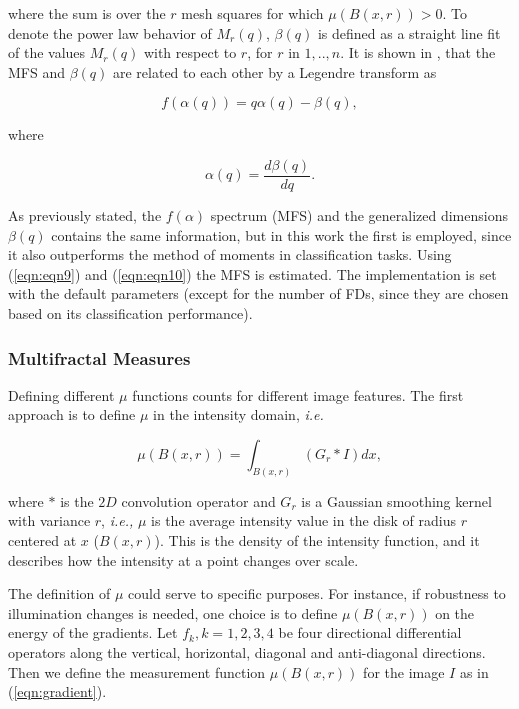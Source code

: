 \documentclass[a4paper,10pt]{article}
\begin{document}
where the sum is over the $r$ mesh squares for which $\mu(B(x,r)) > 0$. To denote the power law behavior of $M_{r}(q)$, $\beta(q)$ is defined as a straight line fit of the values $M_{r}(q)$ with respect to $r$, for $r$ in $1,..,n$. It is shown in \cite{Falconer97}, that the MFS and $\beta(q)$ are related to each other by a Legendre transform as

\begin{equation}
f(\alpha(q)) = q \alpha(q) - \beta(q),
\label{eqn:eqn9}
\end{equation}

where

\begin{equation}
\alpha(q) = \frac{d\beta(q)}{dq}.
\label{eqn:eqn10}
\end{equation}

As previously stated, the $f(\alpha)$ spectrum (MFS) and the generalized dimensions $\beta(q)$ contains the same information, but in this work the first is employed, since it also outperforms the method of moments in classification tasks. Using (\ref{eqn:eqn9}) and (\ref{eqn:eqn10}) the MFS is estimated. The implementation is set with the default parameters (except for the number of FDs, since they are chosen based on its classification performance).


\subsubsection{Multifractal Measures}
Defining different $\mu$ functions counts for different image features. The first approach is to define $\mu$ in the intensity domain, {\em i.e.}

\begin{equation}
\mu(B(x,r)) = \int_{B(x,r)}{(G_{r} \ast I)} dx,
\label{eqn:eqn11}
\end{equation}

where $\ast$ is the $2D$ convolution operator and $G_{r}$ is a Gaussian smoothing kernel with variance $r$, {\em i.e., } $\mu$ is the average intensity value in the disk of radius $r$ centered at $x$ ($B(x,r)$). This is the density of the intensity function, and it describes how the intensity at a point changes over scale.

The definition of $\mu$ could serve to specific purposes. For instance, if robustness to illumination changes is needed, one choice is to define $\mu(B(x,r))$ on the energy of the gradients. Let ${ f_{k} , k = 1, 2, 3, 4}$ be four directional differential operators along the vertical, horizontal, diagonal and anti-diagonal directions. Then we define the measurement function $\mu(B(x,r))$ for the image $I$ as in (\ref{eqn:gradient}).
\end{document}
